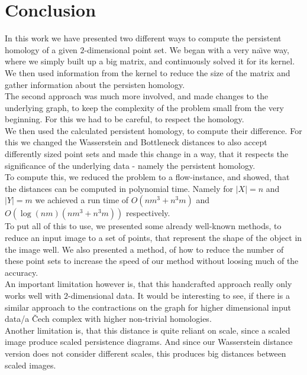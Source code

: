 \documentclass[11pt, a4paper, UKenglish]{article}
\begin{document}
    \section*{Conclusion}
    In this work we have presented two different ways to compute the persistent homology of a given $2$-dimensional point set.
    We began with a very na\"{\i}ve way, where we simply built up a big matrix, and continuously solved it for its kernel.
    We then used information from the kernel to reduce the size of the matrix and gather information about the persisten homology.\\
    The second approach was much more involved, and made changes to the underlying graph, to keep the complexity of the problem small from the very beginning.
    For this we had to be careful, to respect the homology.\\
    We then used the calculated persistent homology, to compute their difference.
    For this we changed the Wasserstein and Bottleneck distances to also accept differently sized point sets and made this change in a way, that it respects the significance of the underlying data - namely the persistent homology.\\
    To compute this, we reduced the problem to a flow-instance, and showed, that the distances can be computed in polynomial time.
    Namely for $|X|=n$ and $|Y|=m$ we achieved a run time of $O(nm^3+n^3 m)$ and $O(\log(nm)(nm^3+n^3 m))$ respectively.\\
    To put all of this to use, we presented some already well-known methods, to reduce an input image to a set of points, that represent the shape of the object in the image well.
    We also presented a method, of how to reduce the number of these point sets to increase the speed of our method without loosing much of the accuracy.\\
    An important limitation however is, that this handcrafted approach really only works well with $2$-dimensional data.
    It would be interesting to see, if there is a similar approach to the contractions on the graph for higher dimensional input data/a Čech complex with higher non-trivial homologies.\\
    Another limitation is, that this distance is quite reliant on scale, since a scaled image produce scaled persistence diagrams.
    And since our Wasserstein distance version does not consider different scales, this produces big distances between scaled images.
    \newpage
\end{document}
